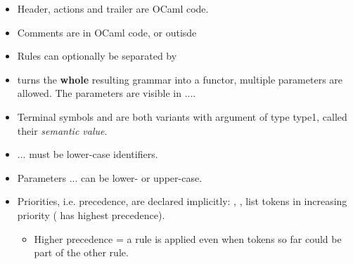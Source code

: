 \documentclass{beamer}
\newcommand{\tmem}[1]{{\em #1\/}}
\newcommand{\tmstrong}[1]{\textbf{#1}}
\newcommand{\tmverbatim}[1]{\text{{\ttfamily{#1}}}}
\begin{document}
\begin{itemize}
  {\hlopt{\%}}{}{\hlopt{:}}{}\\
  {\hlopt{ \textbar }}production4{\hlopt{ \{ }}action4{\hlopt{
  \}}}{\hlendline{}}\\
  {\hlopt{\%}}{}{\hlopt{:}}{}\\
  {\hlopt{ \textbar }}production5{\hlopt{ \{ }}action5{\hlopt{ \}}}{\hlstd{
  }}{\hlopt{\%}}{}{}{}\\
  {\hlopt{\%\%}}{}\\
  trailer{}
  
  \item Header, actions and trailer are OCaml code.
  
  \item Comments are {} in OCaml code, {} or
  {} outisde
  
  \item Rules can optionally be separated by {\hlopt{;}}
  
  \item {\hlopt{\%}}{}turns the {\tmstrong{whole}} resulting
  grammar into a functor, multiple parameters are allowed. The parameters are
  visible in {\hlopt{\%\{}}...{\hlopt{\%\}}}.
  
  \item Terminal symbols {} and {} are both
  variants with argument of type type1, called their {\tmem{semantic value}}.
  
  \item \tmverbatim{rule1}... \tmverbatim{ruleN} must be lower-case
  identifiers.
  
  \item Parameters \tmverbatim{id1}... \tmverbatim{idN} can be lower- or
  upper-case.
  
  \item Priorities, i.e. precedence, are declared implicitly:
  {\hlopt{\%}}{}, {\hlopt{\%}}{},
  {\hlopt{\%}}{} list tokens in increasing priority
  ({} has highest precedence).
  \begin{itemize}
    \item Higher precedence = a rule is applied even when tokens so far could
    be part of the other rule.
    

\end{itemize}
\end{itemize}
\end{document}
